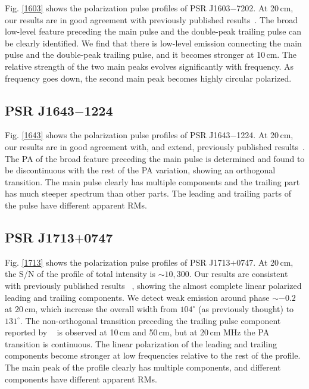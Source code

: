 \documentclass[useAMS,usenatbib]{mn2e}
\begin{document}
Fig. \ref{1603} shows the polarization pulse profiles of 
PSR J1603$-$7202.
%
At 20\,cm, our results are in good agreement with previously published
results~\citep{Ord04,Yan11}.
%
The broad low-level feature preceding the main pulse and the double-peak trailing 
pulse can be clearly identified.
%
We find that there is low-level emission connecting the main pulse and the 
double-peak trailing pulse, and it becomes stronger at 10\,cm.
%
The relative strength of the two main peaks evolves significantly with frequency.
%
As frequency goes down, the second main peak becomes highly circular polarized.


\subsection{PSR J1643$-$1224}

Fig. \ref{1643} shows the polarization pulse profiles of 
PSR J1643$-$1224.
%
At 20\,cm, our results are in good agreement with, and extend, previously published
results~\citep{Ord04,Yan11}.
%
The PA of the broad feature preceding the main pulse is determined and 
found to be discontinuous with the rest of the PA variation, showing 
an orthogonal transition.
%
The main pulse clearly has multiple components and the trailing part has much 
steeper spectrum than other parts. The leading and trailing parts of the pulse 
have different apparent RMs.

\subsection{PSR J1713$+$0747}

Fig. \ref{1713} shows the polarization pulse profiles of 
PSR J1713$+$0747. 
%
At 20\,cm, the S/N of the profile of total intensity is $\sim10,300$. 
Our results are consistent with previously published results
~\citep{Ord04,Yan11}, showing the almost complete linear polarized leading and 
trailing components.
%
We detect weak emission around phase $\sim-0.2$ at 20\,cm, which 
increase the overall width from $104^{\circ}$ (as previously thought) to 
$131^{\circ}$. 
%
The non-orthogonal transition preceding the trailing pulse component reported 
by ~\citet{Yan11} is observed at 10\,cm and 50\,cm, but at 20\,cm MHz 
the PA transition is continuous.
%
The linear polarization of the leading and trailing components become stronger 
at low frequencies relative to the rest of the profile.
%
The main peak of the profile clearly has multiple components, and different 
components have different apparent RMs.
\end{document}
